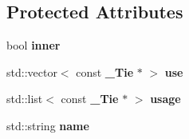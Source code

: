 \subsection*{Protected Attributes}
\begin{DoxyCompactItemize}
\item 
\mbox{\label{classbnf_1_1___tie_aaa82ae6741bf93468654c650fcb66675}} 
bool {\bfseries inner}
\item 
\mbox{\label{classbnf_1_1___tie_ad389488f34be5f98c813498a24274b7e}} 
std\+::vector$<$ const \textbf{ \+\_\+\+Tie} $\ast$ $>$ {\bfseries use}
\item 
\mbox{\label{classbnf_1_1___tie_a6de3678b6baf706a990d2da5f77e786e}} 
std\+::list$<$ const \textbf{ \+\_\+\+Tie} $\ast$ $>$ {\bfseries usage}
\item 
\mbox{\label{classbnf_1_1___tie_a3f421bf925f39f3c571fe97981dd82af}} 
std\+::string {\bfseries name}
\end{DoxyCompactItemize}
